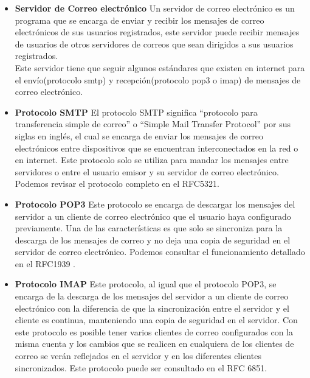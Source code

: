\documentclass[12pt,oneside,onecolumn,openany]{report}
\begin{document}
\begin{itemize}
\item \textbf{Servidor de Correo electrónico}
Un servidor de correo electrónico es un programa que se encarga de enviar y recibir los mensajes de correo electrónicos de sus usuarios registrados, este servidor puede recibir 
mensajes  de  usuarios  de  otros  servidores  de  correos  que  sean  dirigidos  a  sus  usuarios registrados. \\
Este  servidor  tiene  que  seguir  algunos  estándares  que  existen  en  internet  para  el  envío(protocolo smtp)  y recepción(protocolo pop3 o imap) de mensajes de correo electrónico. 
\item \textbf{Protocolo SMTP}
El protocolo SMTP significa “protocolo para transferencia simple de correo” o “Simple Mail  Transfer  Protocol”   por  sus  siglas  en  inglés,  el  cual  se  encarga  de  enviar  los 
mensajes de correo electrónicos entre dispositivos que se encuentran interconectados en la  red  o  en  internet.  Este  protocolo  solo  se  utiliza  para mandar  los  mensajes  entre 
servidores  o  entre  el  usuario  emisor  y  su  servidor  de  correo  electrónico.  Podemos revisar el protocolo completo en el RFC5321\cite{RFC5321}.
\item \textbf{Protocolo POP3}
Este protocolo se encarga de descargar los mensajes del servidor a un cliente de correo electrónico  que  el  usuario  haya  configurado  previamente.  Una  de  las  características  es 
que  solo se sincroniza para  la descarga de  los  mensajes de  correo y  no deja una copia de seguridad en el servidor de correo electrónico. Podemos consultar el funcionamiento detallado en el RFC1939 \cite{1939}.
\item \textbf{Protocolo IMAP}
Este  protocolo,  al  igual  que  el  protocolo  POP3,  se  encarga  de  la descarga  de  los mensajes  del  servidor  a  un  cliente  de  correo  electrónico  con  la  diferencia  de  que  la 
sincronización  entre  el  servidor  y  el  cliente   es continua,  manteniendo  una  copia  de  seguridad  en  el  servidor.  Con  este  protocolo  es 
posible tener varios clientes de correo configurados con la misma  cuenta y los cambios que se realicen en cualquiera de los clientes de correo se verán reflejados en el servidor 
y  en  los  diferentes  clientes  sincronizados.  Este  protocolo  puede  ser  consultado  en  el RFC 6851\cite{6851}.\\ 


\end{itemize}
\end{document}
